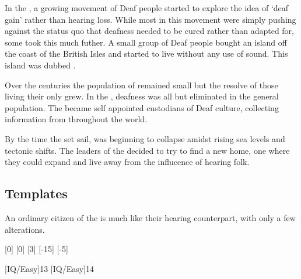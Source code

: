 \documentclass[a4paper,twocolumn]{memoir}
\begin{document}
In the , a growing movement of Deaf people started to explore the
idea of `deaf gain' rather than hearing loss. While most in this movement were
simply pushing against the status quo that deafness needed to be cured rather
than adapted for, some took this much futher. A small group of Deaf people
bought an island off the coast of the British Isles and started to live without
any use of sound. This island was dubbed \deafisland.

Over the centuries the population of \deafisland remained small but the resolve
of those living their only grew. In the , deafness was all but
eliminated in the general population. The \deafies became self appointed
custodians of Deaf culture, collecting information from throughout the world.

By the time the \aventis set sail, \deafisland was beginning to collapse amidst rising
sea levels and tectonic shifts. The leaders of the \deafies decided to try to
find a new home, one where they could expand and live away from the influcence
of hearing folk.

\subsection{Templates}
\label{sec:templates-deafies}
An ordinary citizen of the \deafies is much like their hearing counterpart, with
only a few alterations.

\begin{character}
  [0]
  [0]
  [3]
  [-15]
  [-5]

  [IQ/Easy]{13}
  [IQ/Easy]{14}
\end{character}

\end{document}
